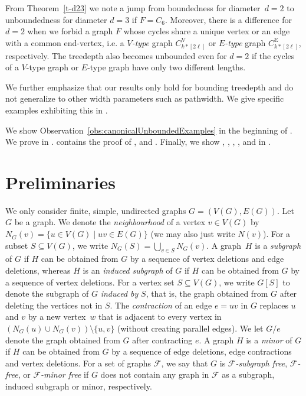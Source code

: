 \documentclass[runningheads,envcountsame]{llncs}
\newcommand{\sharedVertex}[1]{C^{\mathrm{V}}_{#1}}
\newcommand{\sharedEdge}[1]{C^{\mathrm{E}}_{#1}}
\newcommand{\forbiddenClass}{\mathcal{F}}
\begin{document}
\noindent
From Theorem~\ref{t-d23} we note a jump from boundedness for diameter~$d=2$ to unboundedness for diameter $d=3$ if $F=C_6$. Moreover, there is a difference for $d=2$ when we forbid a graph $F$ whose cycles share a unique vertex or an edge with a common end-vertex, i.e. a {\it $V$-type} graph $\sharedVertex{k*[2\ell]}$ or {\it $E$-type} graph $\sharedEdge{k*[2\ell]}$, respectively. The treedepth also becomes unbounded even for $d=2$ if the cycles of a $V$-type graph or $E$-type graph have only two different lengths.

We further emphasize that our results only hold for bounding treedepth and do not generalize to other width parameters such as pathwidth. We give specific examples exhibiting this in .


We show Observation~\ref{obs:canonicalUnboundedExamples} in the beginning of .
We prove  in .
 contains the proof of ,  and . Finally, we show , , ,  ,  and  in .

\section{Preliminaries}\label{sec:pre}

We only consider finite, simple, undirected graphs $G=(V(G),E(G))$.
Let $G$ be a graph. We denote the {\it neighbourhood} of a vertex $v\in V(G)$ by $N_G(v)=\{ u\in V(G)\; |\; uv\in E(G)\}$ (we may also just write $N(v)$). For a subset $S\subseteq V(G)$, we write $N_G(S)=\bigcup_{v \in S}N_G(v)$.
A graph~$H$ is a {\it subgraph} of $G$ if $H$ can be obtained from $G$ by a sequence of vertex deletions and edge deletions, whereas $H$ is an {\it induced subgraph} of $G$ if $H$ can be obtained from $G$ by a sequence of vertex deletions.
For a vertex set $S\subseteq V(G)$, we write $G[S]$ to denote the subgraph of $G$ {\it induced by} $S$, that is, the graph obtained from $G$ after deleting the vertices not in $S$. 
The {\it contraction} of an edge $e=uv$ in $G$ replaces $u$ and $v$ by a new vertex~$w$ that is adjacent to every vertex in $(N_G(u)\cup N_G(v)) \setminus \{u,v\}$ (without creating parallel edges). We let $G/e$ denote the graph obtained from $G$ after contracting $e$.
A graph $H$ is a {\it minor} of $G$ if $H$ can be obtained from $G$ by a sequence of edge deletions, edge contractions and vertex deletions.
For a set of graphs $\forbiddenClass$, we say that $G$ is
\emph{$\forbiddenClass$-subgraph free}, \emph{$\forbiddenClass$-free}, or \emph{$\forbiddenClass$-minor
  free} if $G$ does not contain any graph in $\forbiddenClass$ as a subgraph, induced
subgraph or minor, respectively.
\end{document}

